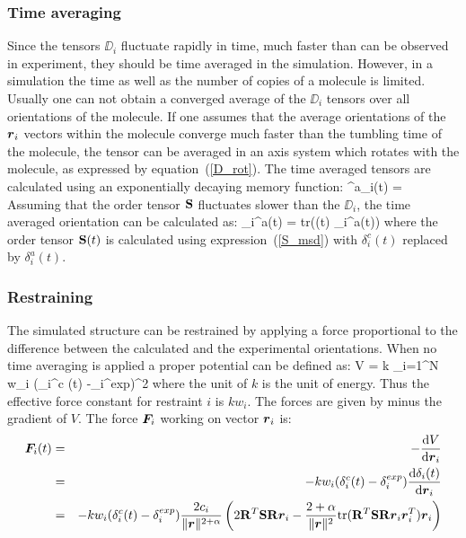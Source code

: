 \subsubsection{Time averaging}
Since the tensors $\DD_i$ fluctuate rapidly in time, much faster than can
be observed in experiment, they should be time averaged in the simulation.
However, in a simulation the time as well as the number of copies of
a molecule is limited. Usually one can not obtain a converged average
of the $\DD_i$ tensors over all orientations of the molecule.
If one assumes that the average orientations of the $\mbox{\boldmath ${r}$}_i$ vectors
within the molecule converge much faster than the tumbling time of
the molecule, the tensor can be averaged in an axis system which
rotates with the molecule, as expressed by equation~(\ref{D_rot}).
The time averaged tensors are calculated
using an exponentially decaying memory function:
\beq
\DD^a_i(t) = 
\eeq
Assuming that the order tensor ${\mathbf S}$ fluctuates slower than the
$\DD_i$, the time averaged orientation can be calculated as:
\beq
\delta_i^a(t) =  \mbox{tr}(\SSS(t) \DD_i^a(t))
\eeq
where the order tensor ${\mathbf S}(t)$ is calculated using expression~(\ref{S_msd})
with $\delta_i^c(t)$ replaced by $\delta_i^a(t)$.

\subsubsection{Restraining}
The simulated structure can be restrained by applying a force proportional
to the difference between the calculated and the experimental orientations.
When no time averaging is applied a proper potential can be defined as:
\beq
V =  k \sum_{i=1}^N w_i (\delta_i^c (t) -\delta_i^{exp})^2
\eeq
where the unit of $k$ is the unit of energy.
Thus the effective force constant for restraint $i$ is $k w_i$.
The forces are given by minus the gradient of $V$.
The force $\mbox{\boldmath ${F}$}\!_i$ working on vector $\mbox{\boldmath ${r}$}_i$ is:
\begin{eqnarray*}
\mbox{\boldmath ${F}$}\!_i(t) 
& = & - \frac{\mbox{d} V}{\mbox{d}\mbox{\boldmath ${r}$}_i} \\
& = & -k w_i (\delta_i^c (t) -\delta_i^{exp}) \frac{\mbox{d} \delta_i (t)}{\mbox{d}\mbox{\boldmath ${r}$}_i} \\
& = & -k w_i (\delta_i^c (t) -\delta_i^{exp})
\frac{2 c_i}{\|\mbox{\boldmath ${r}$}\|^{2+\alpha}} \left(2 {\mathbf R}^T {\mathbf S} {\mathbf R} \mbox{\boldmath ${r}$}_i - \frac{2+\alpha}{\|\mbox{\boldmath ${r}$}\|^2} \mbox{tr}({\mathbf R}^T {\mathbf S} {\mathbf R} \mbox{\boldmath ${r}$}_i \mbox{\boldmath ${r}$}_i^T) \mbox{\boldmath ${r}$}_i \right)
\end{eqnarray*}

